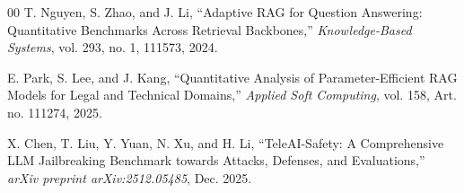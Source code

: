 \documentclass[conference]{IEEEtran}
\begin{document}
\begin{thebibliography}{00}
 T. Nguyen, S. Zhao, and J. Li, ``Adaptive RAG for Question Answering: Quantitative Benchmarks Across Retrieval Backbones,'' \textit{Knowledge-Based Systems}, vol. 293, no. 1, 111573, 2024.

 E. Park, S. Lee, and J. Kang, ``Quantitative Analysis of Parameter-Efficient RAG Models for Legal and Technical Domains,'' \textit{Applied Soft Computing}, vol. 158, Art. no. 111274, 2025.

 X. Chen, T. Liu, Y. Yuan, N. Xu, and H. Li, ``TeleAI-Safety: A Comprehensive LLM Jailbreaking Benchmark towards Attacks, Defenses, and Evaluations,'' \textit{arXiv preprint arXiv:2512.05485}, Dec. 2025.

\end{thebibliography}
\end{document}
